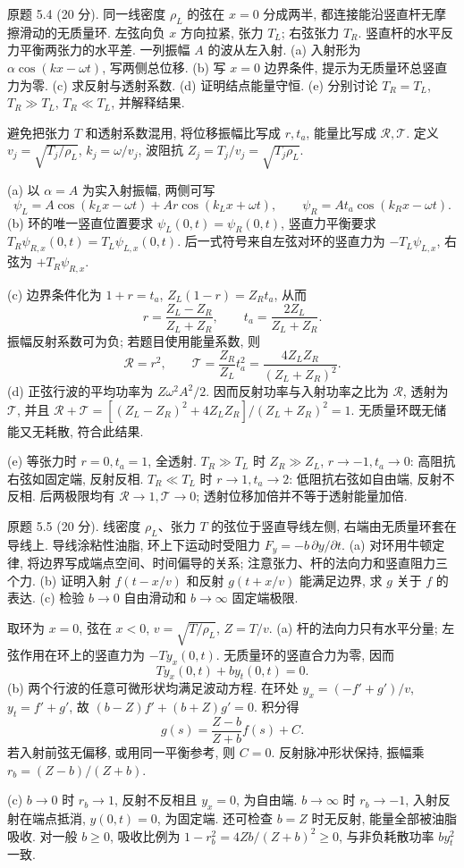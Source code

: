 \begin{exercise}\label{ps:5.4}
原题 5.4 (20 分). 同一线密度 $\rho_L$ 的弦在 $x=0$ 分成两半, 都连接能沿竖直杆无摩擦滑动的无质量环. 左弦向负 $x$ 方向拉紧, 张力 $T_L$; 右弦张力 $T_R$. 竖直杆的水平反力平衡两张力的水平差. 一列振幅 $A$ 的波从左入射. (a) 入射形为 $\alpha\cos(kx-\omega t)$, 写两侧总位移. (b) 写 $x=0$ 边界条件, 提示为无质量环总竖直力为零. (c) 求反射与透射系数. (d) 证明结点能量守恒. (e) 分别讨论 $T_R=T_L$, $T_R\gg T_L$, $T_R\ll T_L$, 并解释结果.
\end{exercise}
\begin{solution}
避免把张力 $T$ 和透射系数混用, 将位移振幅比写成 $r,t_a$, 能量比写成 $\mathcal R,\mathcal T$. 定义 $v_j=\sqrt{T_j/\rho_L}$, $k_j=\omega/v_j$, 波阻抗 $Z_j=T_j/v_j=\sqrt{T_j\rho_L}$.

(a) 以 $\alpha=A$ 为实入射振幅, 两侧可写
\[
\psi_L=A\cos(k_Lx-\omega t)+Ar\cos(k_Lx+\omega t),\qquad
\psi_R=At_a\cos(k_Rx-\omega t).
\]
(b) 环的唯一竖直位置要求 $\psi_L(0,t)=\psi_R(0,t)$, 竖直力平衡要求 $T_R\psi_{R,x}(0,t)=T_L\psi_{L,x}(0,t)$. 后一式符号来自左弦对环的竖直力为 $-T_L\psi_{L,x}$, 右弦为 $+T_R\psi_{R,x}$.

(c) 边界条件化为 $1+r=t_a$, $Z_L(1-r)=Z_Rt_a$, 从而
\[
r=\frac{Z_L-Z_R}{Z_L+Z_R},\qquad t_a=\frac{2Z_L}{Z_L+Z_R}.
\]
振幅反射系数可为负; 若题目使用能量系数, 则
\[
\mathcal R=r^2,\qquad\mathcal T=\frac{Z_R}{Z_L}t_a^2=\frac{4Z_LZ_R}{(Z_L+Z_R)^2}.
\]
(d) 正弦行波的平均功率为 $Z\omega^2A^2/2$. 因而反射功率与入射功率之比为 $\mathcal R$, 透射为 $\mathcal T$, 并且 $\mathcal R+\mathcal T=[(Z_L-Z_R)^2+4Z_LZ_R]/(Z_L+Z_R)^2=1$. 无质量环既无储能又无耗散, 符合此结果.

(e) 等张力时 $r=0,t_a=1$, 全透射. $T_R\gg T_L$ 时 $Z_R\gg Z_L$, $r\to-1,t_a\to0$: 高阻抗右弦如固定端, 反射反相. $T_R\ll T_L$ 时 $r\to1,t_a\to2$: 低阻抗右弦如自由端, 反射不反相. 后两极限均有 $\mathcal R\to1,\mathcal T\to0$; 透射位移加倍并不等于透射能量加倍.
\end{solution}
\begin{exercise}\label{ps:5.5}
原题 5.5 (20 分). 线密度 $\rho_L$、张力 $T$ 的弦位于竖直导线左侧, 右端由无质量环套在导线上. 导线涂粘性油脂, 环上下运动时受阻力 $F_y=-b\,\partial y/\partial t$. (a) 对环用牛顿定律, 将边界写成端点空间、时间偏导的关系; 注意张力、杆的法向力和竖直阻力三个力. (b) 证明入射 $f(t-x/v)$ 和反射 $g(t+x/v)$ 能满足边界, 求 $g$ 关于 $f$ 的表达. (c) 检验 $b\to0$ 自由滑动和 $b\to\infty$ 固定端极限.
\end{exercise}
\begin{solution}
取环为 $x=0$, 弦在 $x<0$, $v=\sqrt{T/\rho_L}$, $Z=T/v$. (a) 杆的法向力只有水平分量; 左弦作用在环上的竖直力为 $-Ty_x(0,t)$. 无质量环的竖直合力为零, 因而
\[
Ty_x(0,t)+by_t(0,t)=0.
\]
(b) 两个行波的任意可微形状均满足波动方程. 在环处 $y_x=(-f'+g')/v$, $y_t=f'+g'$, 故 $(b-Z)f'+(b+Z)g'=0$. 积分得
\[
g(s)=\frac{Z-b}{Z+b}f(s)+C.
\]
若入射前弦无偏移, 或用同一平衡参考, 则 $C=0$. 反射脉冲形状保持, 振幅乘 $r_b=(Z-b)/(Z+b)$.

(c) $b\to0$ 时 $r_b\to1$, 反射不反相且 $y_x=0$, 为自由端. $b\to\infty$ 时 $r_b\to-1$, 入射反射在端点抵消, $y(0,t)=0$, 为固定端. 还可检查 $b=Z$ 时无反射, 能量全部被油脂吸收. 对一般 $b\ge0$, 吸收比例为 $1-r_b^2=4Zb/(Z+b)^2\ge0$, 与非负耗散功率 $b y_t^2$ 一致.
\end{solution}
